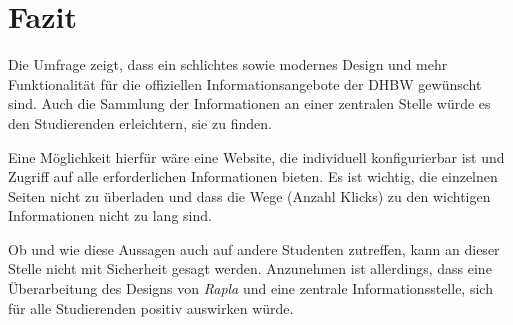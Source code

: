 \section{Fazit}
Die Umfrage zeigt, dass ein schlichtes sowie modernes Design und mehr Funktionalität für die offiziellen Informationsangebote der DHBW gewünscht sind. Auch die Sammlung der Informationen an einer zentralen Stelle würde es den Studierenden erleichtern, sie zu finden.

Eine Möglichkeit hierfür wäre eine Website, die individuell konfigurierbar ist und Zugriff auf alle erforderlichen Informationen bieten. Es ist wichtig, die einzelnen Seiten nicht zu überladen und dass die Wege (Anzahl Klicks) zu den wichtigen Informationen nicht zu lang sind.

Ob und wie diese Aussagen auch auf andere Studenten zutreffen, kann an dieser Stelle nicht mit Sicherheit gesagt werden. Anzunehmen ist allerdings, dass eine Überarbeitung des Designs von \emph{Rapla} und eine zentrale Informationsstelle, sich für alle Studierenden positiv auswirken würde.
